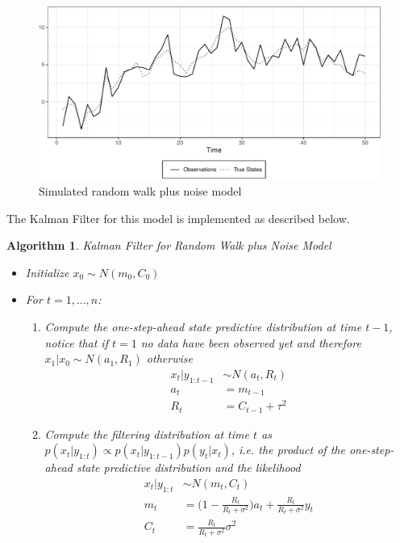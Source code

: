 \documentclass[
]{book}
\theoremstyle{break}
\theoremstyle{nonumberplain}
\newtheorem{algorithm}{Algorithm}[section]
\begin{document}
\begin{figure}[H]

{\centering \includegraphics{prova_knit_finale_files/figure-latex/myfig-1} 

}

\caption{ Simulated random walk plus noise model}\label{fig:myfig}
\end{figure}

The Kalman Filter for this model is implemented as described below.

\begin{algorithm} Kalman Filter for Random Walk plus Noise Model
\begin{itemize}
\item Initialize $x_{0} \sim N(m_{0},C_{0})$
\item For $t=1,...,n$:
\begin{enumerate}
\item Compute the one-step-ahead state predictive distribution at time $t-1$, notice that if $t=1$ no data have been observed yet and therefore $x_{1}|x_{0}\sim N(a_{1},R_{1})$ otherwise
\begin{align*}
x_{t}|y_{1:t-1} & \sim N(a_{t},R_{t})\\
a_{t} & = m_{t-1}\\
R_{t} & = C_{t-1}+\tau^2
\end{align*}
\item Compute the filtering distribution at time $t$ as $p(x_{t}|y_{1:t}) \propto p(x_{t}|y_{1:t-1})p(y_{t}|x_{t})$, i.e. the product of the one-step-ahead state predictive distribution and the likelihood
\begin{align*}
x_{t}|y_{1:t} & \sim N(m_{t},C_{t}) \\
m_{t} & = \big(1-\frac{R_{t}}{R_{t}+\sigma^2}\big)a_{t}+\frac{R_{t}}{R_{t}+\sigma^2}y_{t} \\
C_{t} & = \frac{R_{t}}{R_{t}+\sigma^2}\sigma^2
\end{align*}
\end{enumerate}
\end{itemize}
\end{algorithm}
\end{document}
